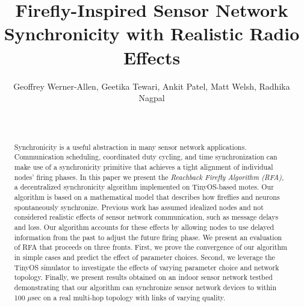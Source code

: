 \documentclass{sig-alternate}
\begin{document}



\title{Firefly-Inspired Sensor Network Synchronicity with Realistic Radio Effects}
\author{
Geoffrey Werner-Allen, Geetika Tewari, Ankit Patel, Matt Welsh, Radhika Nagpal\\
 \\
 \\
}

\maketitle


\begin{abstract}

Synchronicity is a useful abstraction in many sensor network
applications. Communication scheduling, coordinated duty cycling, and
time synchronization can make use of a synchronicity primitive that
achieves a tight alignment of individual nodes' firing phases. In this
paper we present the {\em Reachback Firefly Algorithm (RFA)}, a
decentralized synchronicity algorithm implemented on TinyOS-based
motes. Our algorithm is based on a mathematical model that describes
how fireflies and neurons spontaneously synchronize. Previous work has
assumed idealized nodes and not considered realistic effects of sensor
network communication, such as message delays and loss. Our algorithm
accounts for these effects by allowing nodes to use delayed
information from the past to adjust the future firing phase. We
present an evaluation of RFA that proceeds on three fronts. First, we
prove the convergence of our algorithm in simple cases and predict the
effect of parameter choices. Second, we leverage the TinyOS simulator
to investigate the effects of varying parameter choice and network
topology. Finally, we present results obtained on an indoor sensor
network testbed demonstrating that our algorithm can synchronize
sensor network devices to within 100 $\mu$sec on a real multi-hop
topology with links of varying quality.

\end{abstract}
\end{document}
